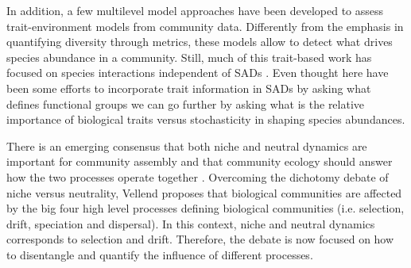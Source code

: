 \documentclass[12pt]{article}
\begin{document}
In addition, a few multilevel model approaches \citep{Pollock2012, Jamil2013, Jamil2013a, Miller2019, TerBraak2019} have been developed to assess trait-environment models from community data. Differently from the emphasis in quantifying diversity through metrics, these models allow to detect what drives species abundance in a community.
Still, much of this trait-based work has focused on species interactions independent of SADs \citep{Swenson2012}. 
Even thought here have been some efforts to incorporate trait information in SADs \citep{Magurran2003, Supp2015} by asking what defines functional groups we can go further by asking what is the relative importance of biological traits versus stochasticity in shaping species abundances.

 
There is an emerging consensus that both niche and neutral dynamics are important for community assembly \citep{Vellend2014} and that community ecology should answer how the two processes operate together \citep{Gravel2006, Herault2007, Ovaskainen2017}. Overcoming the dichotomy debate of niche versus neutrality, Vellend proposes that biological communities are affected by the big four high level processes defining biological communities (i.e. selection, drift, speciation and dispersal). In this context, niche and neutral dynamics %
corresponds to
selection and drift. Therefore, the debate is now focused on how to disentangle and quantify the influence of different processes. %
\end{document}

